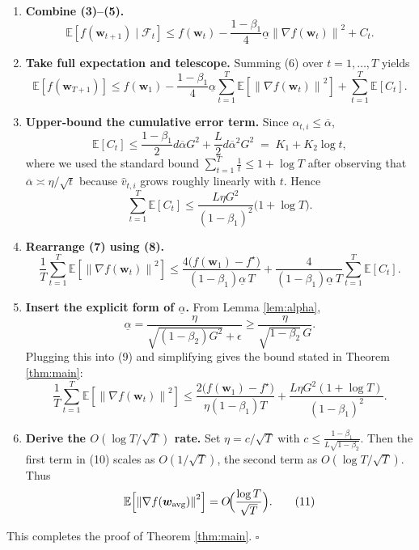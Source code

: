 \documentclass[11pt]{article}
\newcommand{\EE}{\mathbb{E}}
\newcommand{\norm}[1]{\left\lVert #1 \right\rVert}
\begin{document}
\begin{enumerate}[label=[Step \arabic*],leftmargin=*,align=left]
\item \textbf{Combine (3)–(5).}
\[
\EE\!\left[f(\bm{w}_{t+1})\mid\mathcal{F}_t\right]
\le f(\bm{w}_t)-\frac{1-\beta_1}{4}\underline{\alpha}
      \norm{\nabla f(\bm{w}_t)}^{2}+C_t.
\tag{6}
\]

\item \textbf{Take full expectation and telescope.}
Summing (6) over $t=1,\dots,T$ yields
\[
\EE\!\left[f(\bm{w}_{T+1})\right]
\le f(\bm{w}_1)-\frac{1-\beta_1}{4}\underline{\alpha}
      \sum_{t=1}^{T}\EE\!\left[\norm{\nabla f(\bm{w}_t)}^{2}\right]
      +\sum_{t=1}^{T}\EE[C_t].
\tag{7}
\]

\item \textbf{Upper‑bound the cumulative error term.}
Since $\alpha_{t,i}\le\overline{\alpha}$,
\[
\EE[C_t]\le \frac{1-\beta_1}{2}d\overline{\alpha}G^{2}
            +\frac{L}{2}d\overline{\alpha}^{2}G^{2}
          \;=\;K_1+K_2\log t,
\]
where we used the standard bound
$\sum_{t=1}^{T}\frac{1}{t}\le 1+\log T$ after observing that
$\overline{\alpha}\asymp \eta/\sqrt{t}$ because $\hat{v}_{t,i}$ grows roughly linearly with $t$.
Hence
\[
\sum_{t=1}^{T}\EE[C_t]\le
\frac{L\eta G^{2}}{(1-\beta_1)^{2}}\bigl(1+\log T\bigr).
\tag{8}
\]

\item \textbf{Rearrange (7) using (8).}
\[
\frac{1}{T}\sum_{t=1}^{T}\EE\!\left[\norm{\nabla f(\bm{w}_t)}^{2}\right]
\le
\frac{4\bigl(f(\bm{w}_1)-f^\star\bigr)}{(1-\beta_1)\underline{\alpha}\,T}
   +\frac{4}{(1-\beta_1)\underline{\alpha}\,T}\sum_{t=1}^{T}\EE[C_t].
\tag{9}
\]

\item \textbf{Insert the explicit form of $\underline{\alpha}$.}
From Lemma \ref{lem:alpha},
\[
\underline{\alpha}= \frac{\eta}{\sqrt{(1-\beta_2)G^{2}}+\epsilon}
\ge \frac{\eta}{\sqrt{1-\beta_2}\,G}.
\]
Plugging this into (9) and simplifying gives the bound stated in Theorem \ref{thm:main}:
\[
\frac{1}{T}\sum_{t=1}^{T}\EE\!\left[\norm{\nabla f(\bm{w}_t)}^{2}\right]
\le
\frac{2\bigl(f(\bm{w}_1)-f^\star\bigr)}{\eta(1-\beta_1)T}
   +\frac{L\eta G^{2}(1+\log T)}{(1-\beta_1)^{2}}.
\tag{10}
\]

\item \textbf{Derive the $O(\log T/\sqrt{T})$ rate.}
Set $\eta = c/\sqrt{T}$ with $c\le \frac{1-\beta_1}{L\sqrt{1-\beta_2}}$.
Then the first term in (10) scales as $O(1/\sqrt{T})$,
the second term as $O(\log T/\sqrt{T})$.
Thus
\[
\EE\!\left[\norm{\nabla f(\bm{w}_{\text{avg}})}^{2}\right]=O\!\Bigl(\frac{\log T}{\sqrt{T}}\Bigr).
\tag{11}
\]
\end{enumerate}
This completes the proof of Theorem \ref{thm:main}. \hfill $\square$
\end{document}
